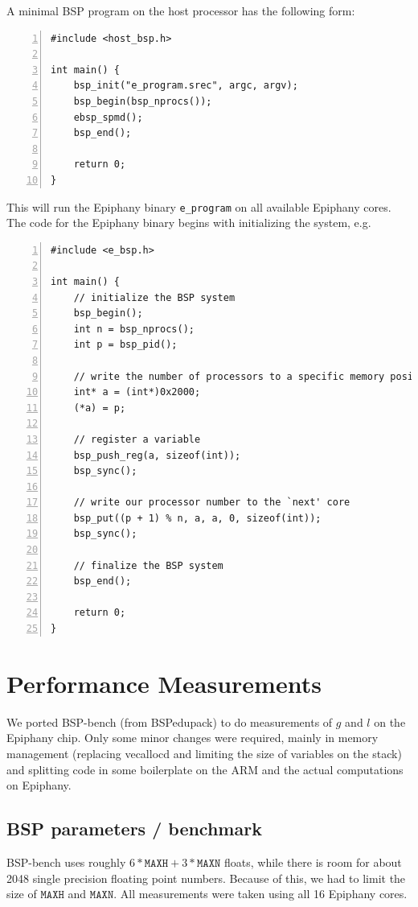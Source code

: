 \documentclass[fleqn]{article}
\renewcommand{\(}{\left(}
\renewcommand{\)}{\right)}
\begin{document}
A minimal BSP program on the host processor has the following form:
\begin{lstlisting}[numbers = left]
#include <host_bsp.h>

int main() {
    bsp_init("e_program.srec", argc, argv);
    bsp_begin(bsp_nprocs());
    ebsp_spmd();
    bsp_end();

    return 0;
}
\end{lstlisting}
This will run the Epiphany binary \verb.e_program. on all available Epiphany cores. The code for the Epiphany binary begins with initializing the system, e.g.\
\begin{lstlisting}[numbers = left]
#include <e_bsp.h>

int main() {
    // initialize the BSP system
    bsp_begin();
    int n = bsp_nprocs();
    int p = bsp_pid();

    // write the number of processors to a specific memory position
    int* a = (int*)0x2000;
    (*a) = p;

    // register a variable
    bsp_push_reg(a, sizeof(int));
    bsp_sync();

    // write our processor number to the `next' core
    bsp_put((p + 1) % n, a, a, 0, sizeof(int));
    bsp_sync();

    // finalize the BSP system
    bsp_end();

    return 0;
}
\end{lstlisting}
\section{Performance Measurements}
We ported BSP-bench (from BSPedupack) to do measurements of $g$ and $l$ on the Epiphany chip. Only some minor changes were required, mainly in memory management (replacing vecallocd and limiting the size of variables on the stack) and splitting code in some boilerplate on the ARM and the actual computations on Epiphany.

\subsection{BSP parameters / benchmark}
BSP-bench uses roughly $6*\mathtt{MAXH}+3*\mathtt{MAXN}$ floats, while there is room for about 2048 single precision floating point numbers. Because of this, we had to limit the size of $\mathtt{MAXH}$ and $\mathtt{MAXN}$. All measurements were taken using all 16 Epiphany cores.
\end{document}
